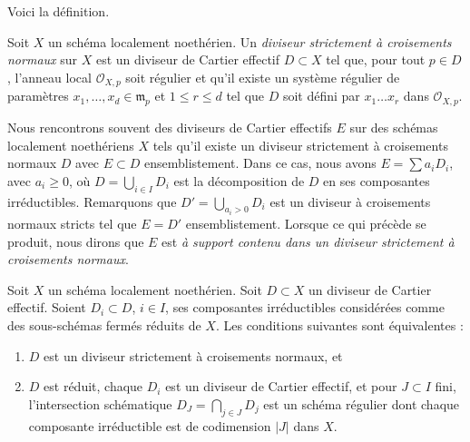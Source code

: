 \noindent
Voici la définition.

\begin{definition}
\label{definition-strict-normal-crossings}
Soit $X$ un schéma localement noethérien. Un
{\it diviseur strictement à croisements normaux}
sur $X$ est un diviseur de Cartier effectif $D \subset X$ tel que,
pour tout $p \in D$, l'anneau local $\mathcal{O}_{X, p}$ soit régulier
et qu'il existe un système régulier de paramètres
$x_1, \ldots, x_d \in \mathfrak m_p$ et $1 \leq r \leq d$
tel que $D$ soit défini par $x_1 \ldots x_r$ dans $\mathcal{O}_{X, p}$.
\end{definition}

\noindent
Nous rencontrons souvent des diviseurs de Cartier effectifs $E$ sur des schémas
localement noethériens $X$ tels qu'il existe un diviseur strictement à croisements normaux $D$
avec $E \subset D$ ensemblistement.
Dans ce cas, nous avons
$E = \sum a_i D_i$, avec $a_i \geq 0$, où $D = \bigcup_{i \in I} D_i$
est la décomposition de $D$ en ses composantes irréductibles.
Remarquons que $D' = \bigcup_{a_i > 0} D_i$ est un diviseur à croisements
normaux stricts tel que $E = D'$ ensemblistement.
Lorsque ce qui précède se produit, nous dirons que
$E$ est {\it à support contenu dans un diviseur strictement à croisements normaux}.

\begin{lemma}
\label{lemma-strict-normal-crossings}
Soit $X$ un schéma localement noethérien. Soit $D \subset X$ un
diviseur de Cartier effectif. Soient $D_i \subset D$, $i \in I$, ses
composantes irréductibles considérées comme des sous-schémas fermés réduits de $X$.
Les conditions suivantes sont équivalentes :
\begin{enumerate}
\item $D$ est un diviseur strictement à croisements normaux, et
\item $D$ est réduit, chaque $D_i$ est un diviseur de Cartier effectif, et
pour $J \subset I$ fini, l'intersection schématique
$D_J = \bigcap_{j \in J} D_j$ est un schéma
régulier dont chaque composante irréductible est de
codimension $|J|$ dans $X$.
\end{enumerate}
\end{lemma}

